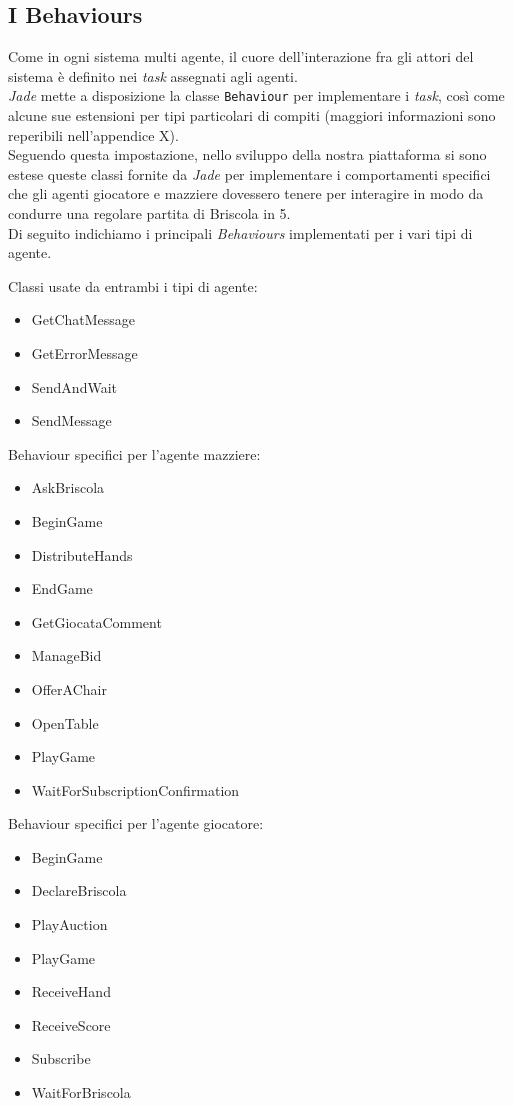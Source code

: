 \documentclass[runningheads,a4paper]{llncs}
\begin{document}
\subsection{I Behaviours}
Come in ogni sistema multi agente, il cuore dell'interazione fra gli attori del sistema è definito nei \emph{task} assegnati agli agenti.\\
\emph{Jade} mette a disposizione la classe \texttt{Behaviour} per implementare i \emph{task}, così come alcune sue estensioni per tipi particolari di compiti (maggiori informazioni sono reperibili nell'appendice X).\\
Seguendo questa impostazione, nello sviluppo della nostra piattaforma si sono estese queste classi fornite da \emph{Jade} per implementare i comportamenti specifici che gli agenti giocatore e mazziere dovessero tenere per interagire in modo da condurre una regolare partita di Briscola in 5.\\
Di seguito indichiamo i principali \emph{Behaviours} implementati per i vari tipi di agente.

Classi usate da entrambi i tipi di agente:
\begin{itemize}
   \item GetChatMessage
   \item GetErrorMessage
   \item SendAndWait
   \item SendMessage
\end{itemize}

Behaviour specifici per l'agente mazziere:

\begin{itemize}
   \item AskBriscola
   \item BeginGame
   \item DistributeHands
   \item EndGame
   \item GetGiocataComment
   \item ManageBid
   \item OfferAChair
   \item OpenTable
   \item PlayGame
   \item WaitForSubscriptionConfirmation
\end{itemize}

Behaviour specifici per l'agente giocatore:

\begin{itemize}
   \item BeginGame
   \item DeclareBriscola
   \item PlayAuction
   \item PlayGame
   \item ReceiveHand
   \item ReceiveScore
   \item Subscribe
   \item WaitForBriscola
\end{itemize}
\end{document}
